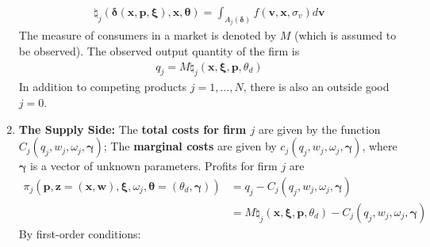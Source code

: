 \documentclass[11pt]{elegantbook}
\begin{document}
\begin{enumerate}
\begin{equation}
        \begin{aligned}
            \natural_j(\boldsymbol{\delta}(\boldsymbol{x},\boldsymbol{p},\boldsymbol{\xi}),\boldsymbol{x},\boldsymbol{\theta})=\int_{A_j(\boldsymbol{\delta})}f(\boldsymbol{v},\boldsymbol{x},\sigma_v)d \boldsymbol{v}
        \end{aligned}
        \nonumber
    \end{equation}
    The measure of consumers in a market is denoted by $M$ (which is assumed to be observed). The observed output quantity of the firm is
    \begin{equation}
        \begin{aligned}
            q_j=M \natural_j(\boldsymbol{x},\boldsymbol{\xi},\boldsymbol{p},\theta_d)
        \end{aligned}
        \nonumber
    \end{equation}
    In addition to competing products $j=1,...,N$, there is also an outside good $j=0$.
    \item \textbf{The Supply Side:}
    \subitem The \textbf{total costs for firm $j$} are given by the function $C_j(q_j,w_j,\omega_j,\boldsymbol{\gamma})$;
    \subitem The \textbf{marginal costs} are given by $c_j(q_j,w_j,\omega_j,\boldsymbol{\gamma})$, where $\boldsymbol{\gamma}$ is a vector of unknown parameters.
    \subitem Profits for firm $j$ are
    \begin{equation}
        \begin{aligned}
            \pi_j(\boldsymbol{p},\boldsymbol{z}=(\boldsymbol{x},\boldsymbol{w}),\boldsymbol{\xi},\omega_j,\boldsymbol{\theta}=(\theta_d,\boldsymbol{\gamma}))&=q_j-C_j(q_j,w_j,\omega_j,\boldsymbol{\gamma})\\
            &=M \natural_j(\boldsymbol{x},\boldsymbol{\xi},\boldsymbol{p},\theta_d)-C_j(q_j,w_j,\omega_j,\boldsymbol{\gamma})
        \end{aligned}
        \nonumber
    \end{equation}
    By first-order conditions:
    \begin{equation}
        \begin{aligned}
        \end{aligned}
        \nonumber
    \end{equation}
\end{enumerate}
\end{document}
